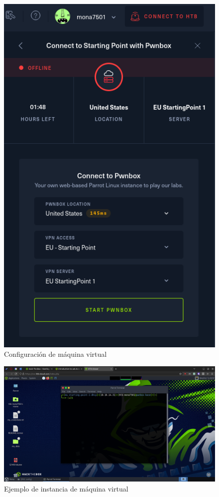 \documentclass{article}
\begin{document}
        \begin{figure}[!htbp]
            \centering
            \includegraphics[scale=0.35]{img/htb-virtual-machine-setup.png}
            \caption{Configuración de máquina virtual}
            \label{fig:htb-vm-creation}
        \end{figure}

        \begin{figure}[!htbp]
            \centering
            \includegraphics[scale=0.25]{img/htb-example-machine.png}
            \caption{Ejemplo de instancia de máquina virtual}
            \label{fig:htb-vm-example}
        \end{figure}
\end{document}
